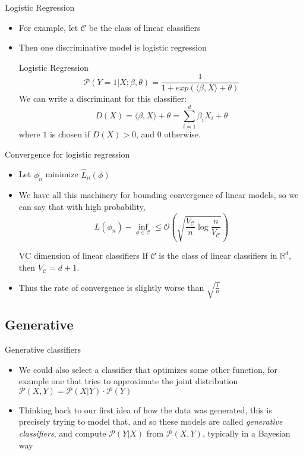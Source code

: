 \documentclass{beamer}
\renewcommand{\Pr}[1]{\mathcal{P} \left( #1 \right)}
\newcommand{\cls}{\mathcal{C}}
\newcommand{\R}{\mathbb{R}}
\newcommand{\pa}[1]{\left( #1 \right)}
\newcommand{\an}[1]{\langle #1 \rangle}
\begin{document}
\begin{frame}{Logistic Regression}
\begin{itemize}
\item For example, let $\cls$ be the class of linear classifiers
\item Then one discriminative model is logistic regression
\begin{block}{Logistic Regression}
\[ \Pr{Y=1|X;\beta,\theta} = \frac1{1+exp(\an{\beta,X} + \theta)} \]
We can write a discriminant for this classifier:
\[ D(X) = \an{\beta,X} + \theta = \sum_{i=1}^d \beta_i X_i + \theta \]
where $1$ is chosen if $D(X) > 0$, and 0 otherwise.
\end{block}
\end{itemize}
\end{frame}

\begin{frame}{Convergence for logistic regression}
\begin{itemize}
\item Let $\phi_n$ minimize $\hat{L}_n(\phi)$
\item We have all this machinery for bounding convergence of linear models, so we can say that with high probability,
\[ L(\phi_n) - \inf_{\phi \in \cls} \leq \mathcal O \pa{ \sqrt{\frac{V_\cls}{n} \log\frac{n}{V_\cls}}} \]
\begin{block}{VC dimension of linear classifiers}
If $\cls$ is the class of linear classifiers in $\R^d$, then $V_\cls = d+1$.
\end{block}
\item Thus the rate of convergence is slightly worse than $\sqrt{\frac1n}$
\end{itemize}
\end{frame}

\subsection{Generative}
\begin{frame}{Generative classifiers}
\begin{itemize}
\item We could also select a classifier that optimizes some other function, for example one that tries to approximate the joint distribution $\Pr{X,Y} = \Pr{X|Y} \cdot \Pr{Y}$
\item Thinking back to our first idea of how the data was generated, this is precisely trying to model that, and so these models are called \emph{generative classifiers}, and compute $\Pr{Y|X}$ from $\Pr{X,Y}$, typically in a Bayesian way
\end{itemize}
\end{frame}
\end{document}

